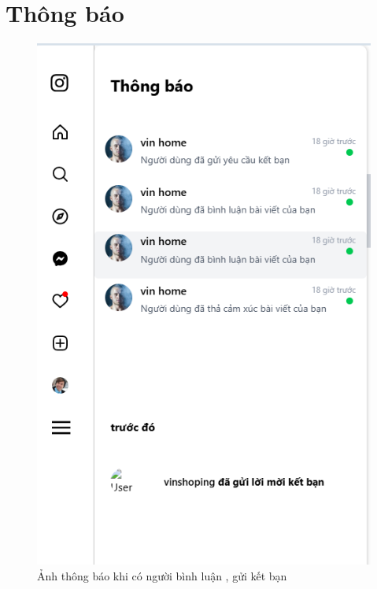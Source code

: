 \FloatBarrier %

\section{Thông báo}
\begin{figure}[H]
    \centering
    \includegraphics[width=1\textwidth]{img/instagram/có thông báo .png}
    \caption{Ảnh thông báo khi có người bình luận , gửi kết bạn}
\end{figure}

\FloatBarrier %
